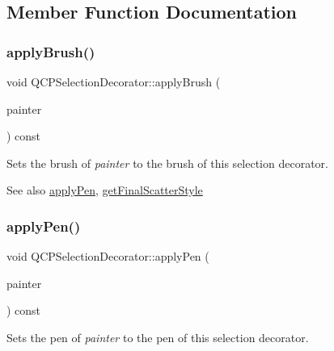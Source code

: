 \subsection{Member Function Documentation}
\mbox{\label{class_q_c_p_selection_decorator_a225544527d51b49546b70d0e6d655a34}} 
\subsubsection{\texorpdfstring{apply\+Brush()}{applyBrush()}}
{\footnotesize\ttfamily void Q\+C\+P\+Selection\+Decorator\+::apply\+Brush (\begin{DoxyParamCaption}\item[{\hyperlink{class_q_c_p_painter}{Q\+C\+P\+Painter} $\ast$}]{painter }\end{DoxyParamCaption}) const}

Sets the brush of {\itshape painter} to the brush of this selection decorator.

\begin{DoxySeeAlso}{See also}
\hyperlink{class_q_c_p_selection_decorator_a75098893f7d08660ea449206810679d7}{apply\+Pen}, \hyperlink{class_q_c_p_selection_decorator_a1277b373248896bc70e8cc1de96da9fa}{get\+Final\+Scatter\+Style} 
\end{DoxySeeAlso}
\mbox{\label{class_q_c_p_selection_decorator_a75098893f7d08660ea449206810679d7}} 
\subsubsection{\texorpdfstring{apply\+Pen()}{applyPen()}}
{\footnotesize\ttfamily void Q\+C\+P\+Selection\+Decorator\+::apply\+Pen (\begin{DoxyParamCaption}\item[{\hyperlink{class_q_c_p_painter}{Q\+C\+P\+Painter} $\ast$}]{painter }\end{DoxyParamCaption}) const}

Sets the pen of {\itshape painter} to the pen of this selection decorator.

